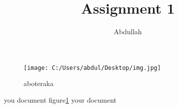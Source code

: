 \documentclass{article}
\title{Assignment 1}
\author{Abdullah}
\begin{document}
	\maketitle
	\newpage
	\begin{figure}%
		\texttt{[image: C:/Users/abdul/Desktop/img.jpg]} %
		\caption{aboteraka}
		\label{fig:abo}
	\end{figure}
	you document figure\ref{fig:abo} your document
	
	
\end{document}
